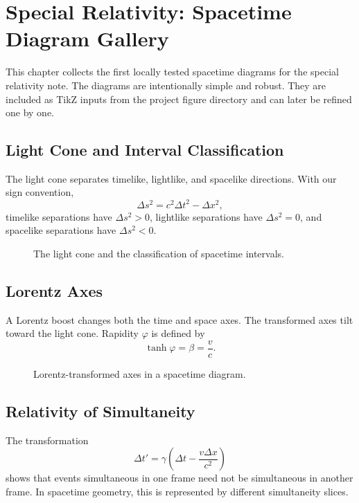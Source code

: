\chapter{Special Relativity: Spacetime Diagram Gallery}

This chapter collects the first locally tested spacetime diagrams for the special
relativity note.  The diagrams are intentionally simple and robust.  They are
included as TikZ inputs from the project figure directory and can later be
refined one by one.

\section{Light Cone and Interval Classification}

The light cone separates timelike, lightlike, and spacelike directions.  With
our sign convention,
\[
\Delta s^2=c^2\Delta t^2-\Delta x^2,
\]
timelike separations have \(\Delta s^2>0\), lightlike separations have
\(\Delta s^2=0\), and spacelike separations have \(\Delta s^2<0\).

\begin{figure}[h!]
  \centering
  
  \caption{The light cone and the classification of spacetime intervals.}
\end{figure}

\clearpage

\section{Lorentz Axes}

A Lorentz boost changes both the time and space axes.  The transformed axes tilt
toward the light cone.  Rapidity \(\varphi\) is defined by
\[
\tanh\varphi=\beta=\frac{v}{c}.
\]

\begin{figure}[h!]
  \centering
  
  \caption{Lorentz-transformed axes in a spacetime diagram.}
\end{figure}

\clearpage

\section{Relativity of Simultaneity}

The transformation
\[
\Delta t'=\gamma\left(\Delta t-\frac{v\Delta x}{c^2}\right)
\]
shows that events simultaneous in one frame need not be simultaneous in another
frame.  In spacetime geometry, this is represented by different simultaneity
slices.

